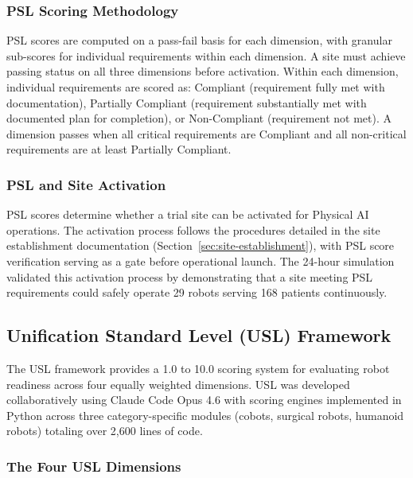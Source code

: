 \subsubsection{PSL Scoring Methodology}

PSL scores are computed on a pass-fail basis for each dimension, with granular
sub-scores for individual requirements within each dimension. A site must
achieve passing status on all three dimensions before activation. Within each
dimension, individual requirements are scored as: Compliant (requirement fully
met with documentation), Partially Compliant (requirement substantially met
with documented plan for completion), or Non-Compliant (requirement not met).
A dimension passes when all critical requirements are Compliant and all
non-critical requirements are at least Partially Compliant.

\subsubsection{PSL and Site Activation}

PSL scores determine whether a trial site can be activated for Physical AI
operations. The activation process follows the procedures detailed in the site
establishment documentation (Section~\ref{sec:site-establishment}), with PSL
score verification serving as a gate before operational launch. The 24-hour
simulation \cite{site-docs} validated this activation process by demonstrating
that a site meeting PSL requirements could safely operate 29 robots serving 168
patients continuously.

\subsection{Unification Standard Level (USL) Framework}
\label{subsec:usl-framework}

The USL framework \cite{usl-standard} provides a 1.0 to 10.0 scoring system
for evaluating robot readiness across four equally weighted dimensions. USL was
developed collaboratively using Claude Code Opus 4.6 \cite{claude-opus} with
scoring engines implemented in Python across three category-specific modules
(cobots, surgical robots, humanoid robots) totaling over 2,600 lines of code.

\subsubsection{The Four USL Dimensions}

